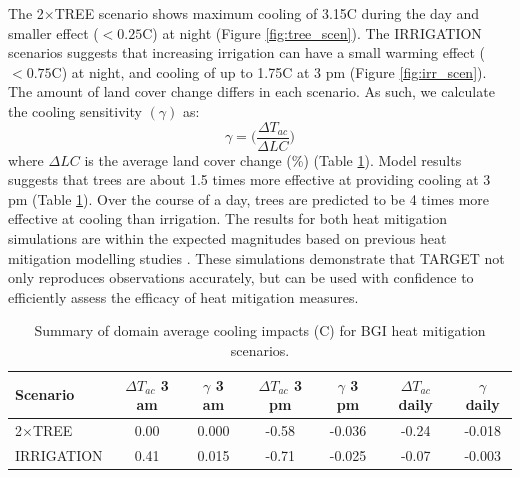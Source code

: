 \documentclass[journal abbreviation, manuscript]{copernicus}
\begin{document}
The 2$\times$TREE scenario  shows maximum cooling of  3.15\degree C during the day and smaller effect ($< 0.25$\degree C) at night (Figure \ref{fig:tree_scen}).  The IRRIGATION scenarios suggests that increasing irrigation can have a small warming effect ($< 0.75$\degree C) at night, and  cooling of up to  1.75\degree C at 3 pm (Figure \ref{fig:irr_scen}).  The amount of  land cover change differs in each scenario. As such, we calculate the cooling sensitivity $(\gamma)$ as:
\begin{equation}
\gamma = \big(\frac{\Delta T_{ac}}{\Delta LC}\big)
\end{equation}where $\Delta LC$ is the average land cover change (\%) (Table \ref{tab:cooling_scen}). Model results suggests that trees  are about 1.5 times more effective at providing cooling at 3 pm (Table \ref{tab:cooling_scen}). Over the course of a day, trees are predicted to be 4 times more effective at cooling than irrigation. The results for both heat mitigation simulations are  within the expected magnitudes based on previous heat mitigation modelling studies \citep{grossman2010,middel2015urban,daniel2016,Broadbent}. These simulations demonstrate that TARGET not only reproduces observations accurately, but can be used with confidence to efficiently assess the efficacy of heat mitigation measures.   

\begin{table}
\begin{center}
\caption{Summary of domain average cooling impacts (\degree C) for BGI heat mitigation scenarios.}
\label{tab:cooling_scen}
\begin{tabular}{l | c c | c c | c c}
\hline
Scenario & $\Delta T_{ac}$ 3 am & $\gamma$ 3 am & $\Delta T_{ac}$ 3 pm &  $\gamma$ 3 pm & $\Delta T_{ac}$ daily  & $\gamma$ daily \\
\hline
2$\times$TREE & 0.00 & 0.000 & -0.58 & -0.036 & -0.24 & -0.018   \\
IRRIGATION    & 0.41  & 0.015 & -0.71 & -0.025 & -0.07 & -0.003  \\
\hline
\end{tabular}

\end{center}
\end{table}
\end{document}
